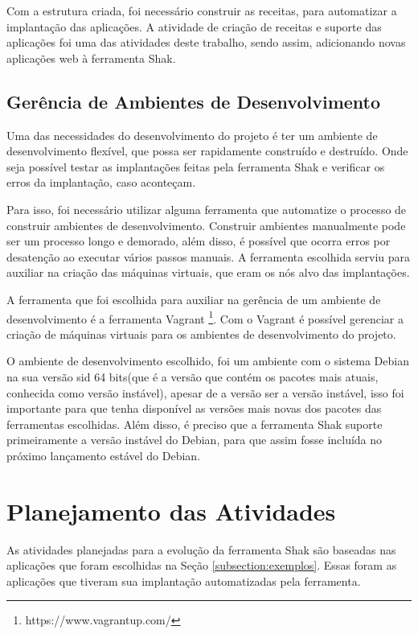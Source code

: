 Com a estrutura criada, foi necessário construir as receitas, para automatizar
a implantação das aplicações. A atividade de 
criação de receitas e suporte das aplicações foi uma das atividades 
deste trabalho, sendo assim, adicionando novas aplicações web à ferramenta Shak.

\subsection{Gerência de Ambientes de Desenvolvimento}

Uma das necessidades do desenvolvimento do projeto é ter um ambiente de desenvolvimento
flexível, que possa ser rapidamente construído e destruído. Onde seja possível 
testar as implantações feitas pela ferramenta Shak e verificar os erros da implantação, caso 
aconteçam. 

Para isso, foi necessário utilizar alguma ferramenta que automatize o processo de 
construir ambientes de desenvolvimento. Construir ambientes manualmente pode
ser um processo longo e demorado, além disso, é possível que ocorra erros por
desatenção ao executar vários passos manuais. A ferramenta escolhida serviu para
auxiliar na criação das máquinas virtuais, que eram os nós alvo 
das implantações.

A ferramenta que foi escolhida para auxiliar na gerência de um ambiente de desenvolvimento é
a ferramenta Vagrant \footnote{https://www.vagrantup.com/}. Com o Vagrant é 
possível gerenciar a criação de máquinas
virtuais para os ambientes de desenvolvimento do projeto.

O ambiente de desenvolvimento escolhido, foi um ambiente com o sistema Debian na sua versão
sid 64 bits(que é a versão que contém os pacotes mais atuais, conhecida como versão instável),
apesar de a versão ser a versão instável, isso foi importante para que tenha disponível 
as versões mais novas dos pacotes das ferramentas escolhidas. Além disso, é preciso que a ferramenta Shak suporte primeiramente a versão instável do Debian, para que assim 
fosse incluída no próximo lançamento estável do Debian.

\section{Planejamento das Atividades}

As atividades planejadas para a evolução da ferramenta Shak são baseadas nas 
aplicações que foram escolhidas na Seção
\ref{subsection:exemplos}. Essas foram as aplicações que tiveram
sua implantação automatizadas pela ferramenta. 

